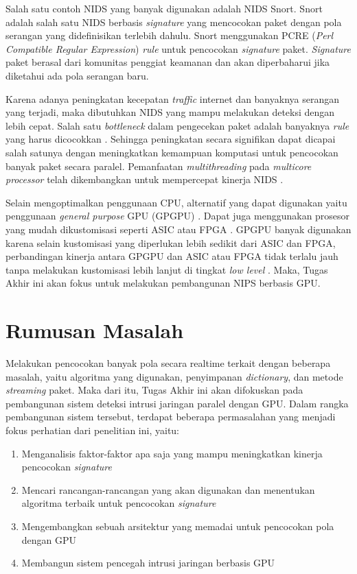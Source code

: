   Salah satu contoh NIDS yang banyak digunakan adalah NIDS Snort. Snort adalah salah satu NIDS berbasis \emph{signature} yang mencocokan paket dengan pola serangan yang didefinisikan terlebih dahulu. Snort menggunakan PCRE (\emph{Perl Compatible Regular Expression}) \emph{rule} untuk pencocokan \emph{signature} paket. \emph{Signature} paket berasal dari komunitas penggiat keamanan dan akan diperbaharui jika diketahui ada pola serangan baru.

  Karena adanya peningkatan kecepatan \emph{traffic} internet dan banyaknya serangan yang terjadi, maka dibutuhkan NIDS yang mampu melakukan deteksi dengan lebih cepat. Salah satu \emph{bottleneck} dalam pengecekan paket adalah banyaknya \emph{rule} yang harus dicocokkan \citep{pcre2007}. Sehingga peningkatan secara signifikan dapat dicapai salah satunya dengan meningkatkan kemampuan komputasi untuk pencocokan banyak paket secara paralel. Pemanfaatan \emph{multithreading} pada \emph{multicore processor} telah dikembangkan untuk mempercepat kinerja NIDS \citep{multi2004}.

  Selain mengoptimalkan penggunaan CPU, alternatif yang dapat digunakan yaitu penggunaan \emph{general purpose} GPU (GPGPU) \citep{4482891}. Dapat juga menggunakan prosesor yang mudah dikustomisasi seperti ASIC atau FPGA \citep{fpga2008}. GPGPU banyak digunakan karena selain kustomisasi yang diperlukan lebih sedikit dari ASIC dan FPGA, perbandingan kinerja antara GPGPU dan ASIC atau FPGA tidak terlalu jauh tanpa melakukan kustomisasi lebih lanjut di tingkat \emph{low level} \citep{gnort2008}. Maka, Tugas Akhir ini akan fokus untuk melakukan pembangunan NIPS berbasis GPU.

\section{Rumusan Masalah}

  Melakukan pencocokan banyak pola secara realtime terkait dengan beberapa masalah, yaitu algoritma yang digunakan, penyimpanan \emph{dictionary}, dan metode \emph{streaming} paket. Maka dari itu, Tugas Akhir ini akan difokuskan pada pembangunan sistem deteksi intrusi jaringan paralel dengan GPU. Dalam rangka pembangunan sistem tersebut, terdapat beberapa permasalahan yang menjadi fokus perhatian dari penelitian ini, yaitu: \\
  \begin{enumerate}
      \item Menganalisis faktor-faktor apa saja yang mampu meningkatkan kinerja pencocokan \emph{signature}
      \item Mencari rancangan-rancangan yang akan digunakan dan menentukan algoritma terbaik untuk pencocokan \emph{signature}
      \item Mengembangkan sebuah arsitektur yang memadai untuk pencocokan pola dengan GPU
      \item Membangun sistem pencegah intrusi jaringan berbasis GPU
  \end{enumerate}

